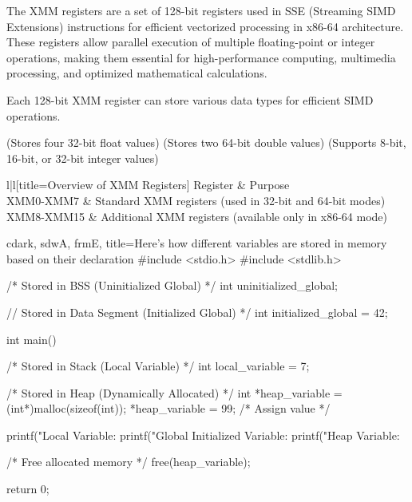 \begin{NxSSSSBox}[breakable]
	\begin{NxIDBox}[title={XMM Registers in x86-64 (ELF64)}]
		The XMM registers are a set of 128-bit registers used in SSE (Streaming SIMD Extensions) instructions for efficient vectorized processing in x86-64 architecture. These registers allow parallel execution of multiple floating-point or integer operations, making them essential for high-performance computing, multimedia processing, and optimized mathematical calculations.
	\end{NxIDBox}
	\begin{NxIDBox}
		Each 128-bit XMM register can store various data types for efficient SIMD operations.
		\begin{NxListDark}
			 (Stores four 32-bit float values)
			 (Stores two 64-bit double values)
			 (Supports 8-bit, 16-bit, or 32-bit integer values)
		\end{NxListDark}
	\end{NxIDBox}
	\begin{NxIDBoxT}{l|l}[title={Overview of XMM Registers}]
		Register & Purpose\\\hline
		XMM0-XMM7 & Standard XMM registers (used in 32-bit and 64-bit modes)\\\hline
		XMM8-XMM15 & Additional XMM registers (available only in x86-64 mode)\\
	\end{NxIDBoxT}
\end{NxSSSSBox}

\begin{NxCodeBox}{c}{dark, sdwA, frmE, title={Here’s how different variables are stored in memory based on their declaration}}
	#include <stdio.h>
	#include <stdlib.h>

	/* Stored in BSS (Uninitialized Global) */
	int uninitialized_global;

	// Stored in Data Segment (Initialized Global) */
	int initialized_global = 42;

	int main() {
		/* Stored in Stack (Local Variable) */
		int local_variable = 7;

		/* Stored in Heap (Dynamically Allocated) */
		int *heap_variable = (int*)malloc(sizeof(int));
		*heap_variable = 99; /* Assign value */

		printf("Local Variable: %
		printf("Global Initialized Variable: %
		printf("Heap Variable: %

		/* Free allocated memory */
		free(heap_variable);

		return 0;
	}
\end{NxCodeBox}

